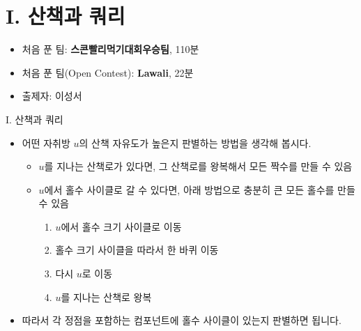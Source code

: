 \def\probno{I}
\def\probtitle{산책과 쿼리}

\section{\probno{}. \probtitle{}}

\begin{frame} %
    \sectiontitle{\probno{}}{\probtitle{}}
    \begin{itemize}
        \item 처음 푼 팀: \textbf{스콘빨리먹기대회우승팀}, 110분
        \item 처음 푼 팀(Open Contest): \textbf{Lawali}, 22분
        \item 출제자: 이성서
    \end{itemize}
\end{frame}

\begin{frame}{\probno{}. \probtitle{}}
    \begin{itemize}
        \item 어떤 자취방 $u$의 산책 자유도가 높은지 판별하는 방법을 생각해 봅시다.

        \begin{itemize}
            \item $u$를 지나는 산책로가 있다면, 그 산책로를 왕복해서 모든 짝수를 만들 수 있음
            \item $u$에서 홀수 사이클로 갈 수 있다면, 아래 방법으로 충분히 큰 모든 홀수를 만들 수 있음
                \begin{enumerate}
                    \item $u$에서 홀수 크기 사이클로 이동
                    \item 홀수 크기 사이클을 따라서 한 바퀴 이동
                    \item 다시 $u$로 이동
                    \item $u$를 지나는 산책로 왕복
                \end{enumerate}
        \end{itemize}
        \item 따라서 각 정점을 포함하는 컴포넌트에 홀수 사이클이 있는지 판별하면 됩니다.
    \end{itemize}
\end{frame}

